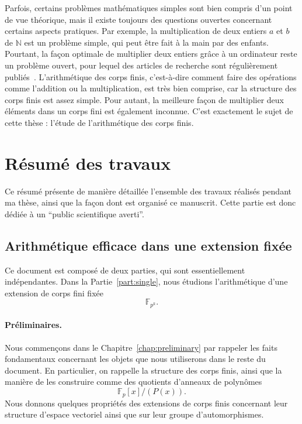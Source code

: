 Parfois, certains problèmes mathématiques simples sont bien compris d'un point
de vue théorique, mais il existe toujours des questions ouvertes concernant
certains aspects pratiques. Par exemple, la multiplication de deux entiers $a$
et $b$ de $\mathbb{N}$ est un problème simple, qui peut être fait à la main par
des enfants. Pourtant, la façon optimale de multiplier deux entiers
gr\^ace à un ordinateur reste un problème ouvert, pour lequel des articles de
recherche sont régulièrement publiés~\cite{HVDH19}. L'arithmétique des corps
finis, c'est-à-dire comment faire des opérations comme l'addition ou la
multiplication, est très bien comprise, car la structure des corps finis est
assez simple. Pour autant, la meilleure façon de multiplier deux éléments dans
un corps fini est également inconnue. C'est exactement le sujet de cette thèse :
l'étude de l'arithmétique des corps finis.

\section*{Résumé des travaux}

Ce résumé présente de manière détaillée l'ensemble des travaux réalisés pendant
ma thèse, ainsi que la façon dont est organisé ce manuscrit. Cette partie est
donc dédiée à un ``public scientifique averti''.

\subsection*{Arithmétique efficace dans une extension fixée}

Ce document est composé de deux parties, qui sont essentiellement indépendantes.
Dans la Partie~\ref{part:single}, nous étudions l'arithmétique d'une extension
de corps fini fixée
\[
  \mathbb{F}_{p^{k}}.
\]
\paragraph{Préliminaires.} Nous commençons dans le
Chapitre~\ref{chap:preliminary} par rappeler les faits fondamentaux concernant
les objets que nous utiliserons dans le reste du document. En particulier, on
rappelle la structure des corps finis, ainsi que la manière de les construire
comme des quotients d'anneaux de polynômes
\[
  \mathbb{F}_p[x]/(P(x)).
\]
Nous donnons quelques propriétés des extensions de corps finis concernant leur
structure d'espace vectoriel ainsi que sur leur groupe d'automorphismes.

